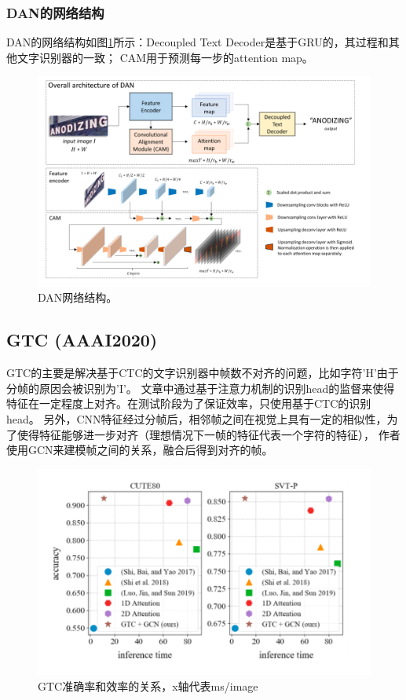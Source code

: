 \subsubsection{DAN的网络结构}
DAN的网络结构如图\ref{dan_framework}所示：Decoupled Text Decoder是基于GRU的，其过程和其他文字识别器的一致；
CAM用于预测每一步的attention map。
\begin{figure}[H]
    \centering
    \includegraphics[width=.9\textwidth]{figure/recognition/dan_framework.png} 
    \caption{DAN网络结构。} 
    \label{dan_framework} 
\end{figure}

\subsection{GTC (AAAI2020)}
GTC\cite{hu2020gtc}的主要是解决基于CTC的文字识别器中帧数不对齐的问题，比如字符'H'由于分帧的原因会被识别为'I'。
文章中通过基于注意力机制的识别head的监督来使得特征在一定程度上对齐。在测试阶段为了保证效率，只使用基于CTC的识别head。
另外，CNN特征经过分帧后，相邻帧之间在视觉上具有一定的相似性，为了使得特征能够进一步对齐（理想情况下一帧的特征代表一个字符的特征），
作者使用GCN来建模帧之间的关系，融合后得到对齐的帧。
\begin{figure}[H]
    \centering
    \includegraphics[width=.8\textwidth]{figure/recognition/gtc_introduction.png} 
    \caption{GTC准确率和效率的关系，x轴代表ms/image} 
    \label{gtc_introduction} 
\end{figure}

